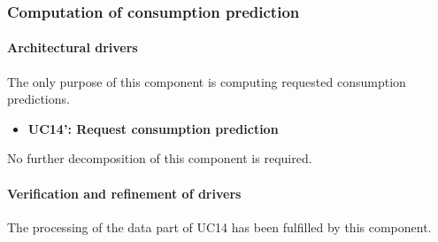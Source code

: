 \subsubsection{Computation of consumption prediction}
\paragraph{Architectural drivers}
The only purpose of this component is computing requested consumption predictions.
\begin{itemize}
	\item \textbf{UC14': Request consumption prediction}
\end{itemize}
No further decomposition of this component is required.


\paragraph{Verification and refinement of drivers}
The processing of the data part of UC14 has been fulfilled by this component.
